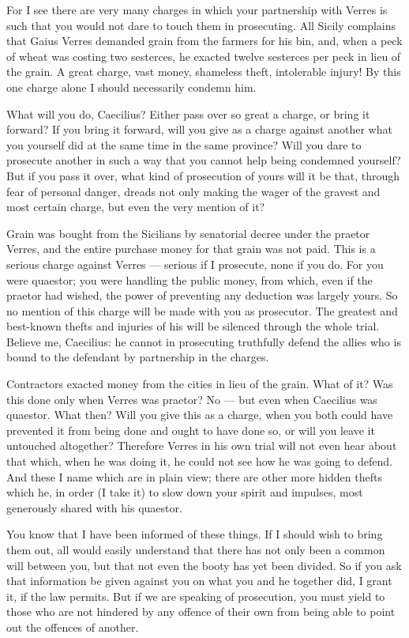  For I see there are very many charges in which your partnership with Verres is such that you would not dare to touch them in prosecuting. All Sicily complains that Gaius Verres demanded grain from the farmers for his bin, and, when a peck of wheat was costing two sesterces, he exacted twelve sesterces per peck in lieu of the grain. A great charge, vast money, shameless theft, intolerable injury! By this one charge alone I should necessarily condemn him.

 What will you do, Caecilius? Either pass over so great a charge, or bring it forward? If you bring it forward, will you give as a charge against another what you yourself did at the same time in the same province? Will you dare to prosecute another in such a way that you cannot help being condemned yourself? But if you pass it over, what kind of prosecution of yours will it be that, through fear of personal danger, dreads not only making the wager of the gravest and most certain charge, but even the very mention of it?

 Grain was bought from the Sicilians by senatorial decree under the praetor Verres, and the entire purchase money for that grain was not paid. This is a serious charge against Verres --- serious if I prosecute, none if you do. For you were quaestor; you were handling the public money, from which, even if the praetor had wished, the power of preventing any deduction was largely yours. So no mention of this charge will be made with you as prosecutor. The greatest and best-known thefts and injuries of his will be silenced through the whole trial. Believe me, Caecilius: he cannot in prosecuting truthfully defend the allies who is bound to the defendant by partnership in the charges.

 Contractors exacted money from the cities in lieu of the grain. What of it? Was this done only when Verres was praetor? No --- but even when Caecilius was quaestor. What then? Will you give this as a charge, when you both could have prevented it from being done and ought to have done so, or will you leave it untouched altogether? Therefore Verres in his own trial will not even hear about that which, when he was doing it, he could not see how he was going to defend. And these I name which are in plain view; there are other more hidden thefts which he, in order (I take it) to slow down your spirit and impulses, most generously shared with his quaestor.

 You know that I have been informed of these things. If I should wish to bring them out, all would easily understand that there has not only been a common will between you, but that not even the booty has yet been divided. So if you ask that information be given against you on what you and he together did, I grant it, if the law permits. But if we are speaking of prosecution, you must yield to those who are not hindered by any offence of their own from being able to point out the offences of another.


